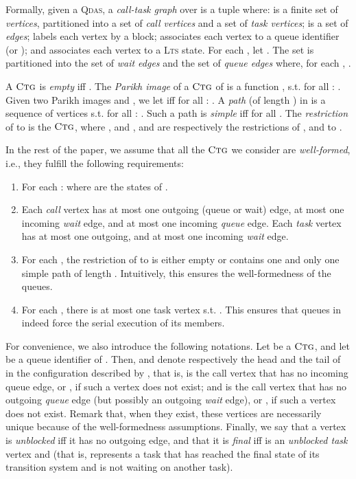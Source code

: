 \documentclass[runningheads,oribibl,]{article}
\newcommand{\lts}{\textsc{Lts}\xspace}
\newcommand{\qdas}{\textsc{Qdas}\xspace}
\newcommand{\ctg}{\ensuremath{\textsc{Ctg}}\xspace}
\begin{document}
  Formally, given a \qdas , a \emph{call-task
    graph} over  is a tuple
   where:  is a finite set of \emph{vertices}, partitioned into a set
   of \emph{call vertices} and a set  of \emph{task
    vertices};  is a set of \emph{edges};
   labels each vertex by a block;
   associates each vertex to
  a queue  identifier
  (or ); and  associates each vertex
  to a \lts state.
  For each , let . The set
   is partitioned into the set  of \emph{wait edges} and the
  set  of \emph{queue edges} where, for
  each , .

A \ctg is \emph{empty} iff . The \emph{Parikh image}
 of a \ctg  of  is a function
, s.t. for all : . Given two Parikh images  and
, we let  iff for all : .
A \emph{path} (of length ) in  is a sequence of
vertices  s.t. for all :
. Such a path is \emph{simple} iff 
for all . The \emph{restriction} of  to
 is the \ctg , where , and ,
 and  are respectively the restrictions of
,  and  to .

In the rest of the paper, we  assume that all the \ctg we
consider are \emph{well-formed}, i.e., they fulfill the following
requirements:
\begin{enumerate}
  \item For each : 
    where  are the states of .
\item Each \emph{call} vertex has at most one outgoing (queue or wait)
  edge, at most one incoming \emph{wait} edge, and at most one
  incoming \emph{queue} edge. Each \emph{task} vertex has at most one
  outgoing, and at most one incoming \emph{wait} edge.
\item For each , the restriction of  to 
  is either empty or contains one and only one simple path of length
  . Intuitively, this ensures the well-formedness of the
  queues.
\item For each , there is at most one task vertex 
  s.t. . This ensures that queues in  indeed
  force the serial execution of its members.
\end{enumerate}

For convenience, we also introduce the following notations. Let
 be a \ctg, and let  be a queue identifier of
. Then,  and  denote
respectively the head and the tail of  in the configuration
described by , that is,  is the call
vertex  that has no incoming queue edge, or , if such
a vertex does not exist; and  is the call vertex
 that has no outgoing \emph{queue} edge (but possibly an
outgoing \emph{wait} edge), or , if such a vertex does not
exist. Remark that, when they exist, these vertices are necessarily
unique because of the well-formedness assumptions. Finally, we say
that a vertex  is \emph{unblocked} iff it has no outgoing edge, and
that it is \emph{final} iff   is an \emph{unblocked task}
vertex and   (that is,  represents a
task that has reached the final state of its transition system and is
not waiting on another task).
\end{document}
